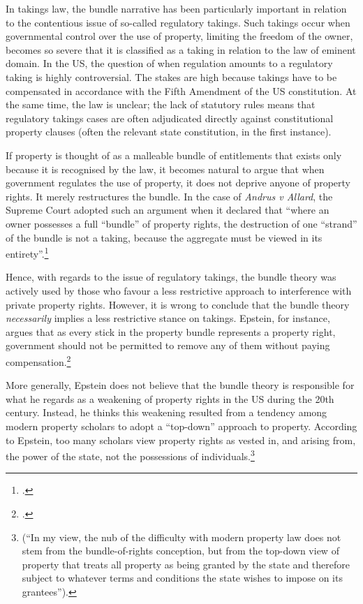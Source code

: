 In takings law, the bundle narrative has been particularly important in relation to the contentious issue of so-called regulatory takings. Such takings occur when governmental control over the use of property, limiting the freedom of the owner, becomes so severe that it is classified as a taking in relation to the law of eminent domain. In the US, the question of when regulation amounts to a regulatory taking is highly controversial. The stakes are high because takings have to be compensated in accordance with the Fifth Amendment of the US constitution. At the same time, the law is unclear; the lack of statutory rules means that regulatory takings cases are often adjudicated directly against constitutional property clauses (often the relevant state constitution, in the first instance).

If property is thought of as a malleable bundle of entitlements that exists only because it is recognised by the law, it becomes natural to argue that when government regulates the use of property, it does not deprive anyone of property rights. It merely restructures the bundle. In the case of {\it Andrus v Allard}, the Supreme Court adopted such an argument when it declared that ``where an owner possesses a full ``bundle'' of property rights, the destruction of one ``strand'' of the bundle is not a taking, because the aggregate must be viewed in its entirety''.\footcite[65--66]{andrus79}

Hence, with regards to the issue of regulatory takings, the bundle theory was actively used by those who favour a less restrictive approach to interference with private property rights. However, it is wrong to conclude that the bundle theory {\it necessarily} implies a less restrictive stance on takings. Epstein, for instance, argues that as every stick in the property bundle represents a property right, government should not be permitted to remove any of them without paying compensation.\footcite[232-233]{epstein11} 

More generally, Epstein does not believe that the bundle theory is responsible for what he regards as a weakening of property rights in the US during the 20th century. Instead, he thinks this weakening resulted from a tendency among modern property scholars to adopt a ``top-down'' approach to property. According to Epstein, too many scholars view property rights as vested in, and arising from, the power of the state, not the possessions of individuals.\footnote{\cite[227-228]{epstein11} (``In my view, the nub of the difficulty with modern property law does not stem from the bundle-of-rights conception, but from the top-down view of property that treats all property as being granted by the state and therefore subject to whatever terms and conditions the state wishes to impose on its grantees'').} 

